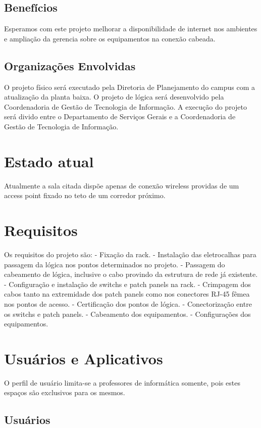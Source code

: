 \documentclass[	DIV=calc,
							paper=a4,
							fontsize=12pt,
							onecolumn]{scrartcl}
\begin{document}
 
\subsection{Benefícios}
Esperamos com este projeto melhorar a disponibilidade de internet nos ambientes e ampliação da gerencia sobre os equipamentos na conexão cabeada.

\subsection{Organizações Envolvidas}
O projeto físico será executado pela Diretoria de Planejamento do campus com a atualização da planta baixa.
O projeto de lógica será desenvolvido pela Coordenadoria de Gestão de Tecnologia de Informação.
A execução do projeto será divido entre o Departamento de Serviços Gerais e a Coordenadoria de Gestão de Tecnologia de Informação.

\section{Estado atual}
Atualmente a sala citada dispõe apenas de conexão wireless providas de um access point fixado no teto de um corredor próximo.

\section{Requisitos}
Os requisitos do projeto são:
- Fixação da rack.
- Instalação das eletrocalhas para passagem da lógica nos pontos determinados no projeto.
- Passagem do cabeamento de lógica, inclusive o cabo provindo da estrutura de rede já existente.
- Configuração e instalação de switchs e patch panels na rack.
- Crimpagem dos cabos tanto na extremidade dos patch panels como nos conectores RJ-45 fêmea nos pontos de acesso.
- Certificação dos pontos de lógica.
- Conectorização entre os switchs e patch panels.
- Cabeamento dos equipamentos.
- Configurações dos equipamentos.

\section{Usuários e Aplicativos}

O perfil de usuário limita-se a professores de informática somente, pois estes espaços são exclusivos para os mesmos. 

\subsection{Usuários}
\end{document}
